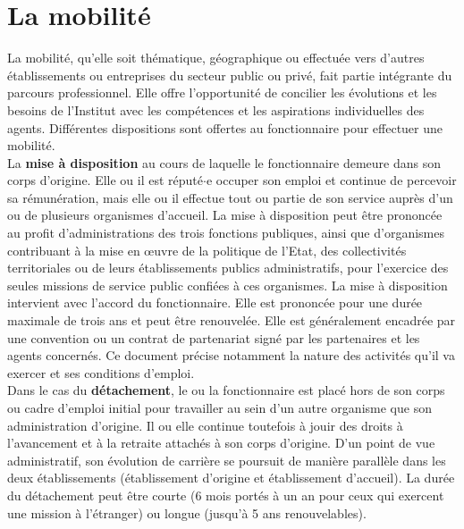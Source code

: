 \section{La mobilit\'e}

La mobilit\'e, qu'elle soit th\'ematique, g\'eographique ou effectu\'ee vers d'autres \'etablissements ou entreprises du secteur public ou priv\'e, fait partie int\'egrante du parcours professionnel. Elle offre l'opportunit\'e de concilier les \'evolutions et les besoins de l'Institut avec les comp\'etences et les aspirations individuelles des agents.
Diff\'erentes dispositions sont offertes au fonctionnaire pour effectuer une mobilit\'e. \\

La {\bf mise \`a disposition} au cours de laquelle le fonctionnaire demeure dans son corps d'origine. Elle ou il est r\'eput\'e$\cdot$e occuper son emploi et continue de percevoir sa r\'emun\'eration,
mais elle ou il effectue tout ou partie de son service aupr\`es d'un ou de plusieurs organismes d'accueil. La mise \`a disposition peut \^etre prononc\'ee au profit d'administrations des trois fonctions publiques, ainsi que d'organismes contribuant \`a la mise en \oe uvre de la politique de l'Etat, des collectivit\'es territoriales ou de leurs \'etablissements publics administratifs, pour l'exercice des seules missions de service public confi\'ees \`a ces organismes. La mise \`a disposition intervient avec l'accord du fonctionnaire. Elle est prononc\'ee pour une dur\'ee maximale de trois ans et peut \^etre renouvel\'ee. Elle est g\'en\'eralement encadr\'ee par une convention ou un contrat  de partenariat sign\'e par les partenaires et les agents concern\'es. Ce document pr\'ecise notamment la nature des activit\'es qu'il va exercer et ses conditions d'emploi.\\

Dans le cas du {\bf d\'etachement}, le ou la fonctionnaire est plac\'e hors de son corps ou cadre d'emploi initial pour travailler au sein d'un autre organisme que son administration d'origine. Il ou elle continue toutefois \`a jouir des droits \`a l'avancement et \`a la retraite attach\'es \`a son corps d'origine. D'un point de vue administratif, son \'evolution de carri\`ere se poursuit de mani\`ere parall\`ele dans les deux \'etablissements (\'etablissement d'origine et \'etablissement d'accueil). La dur\'ee du d\'etachement peut \^etre courte (6 mois port\'es \`a un an pour ceux qui exercent une mission \`a l'\'etranger) ou longue (jusqu'\`a 5 ans renouvelables).\\


